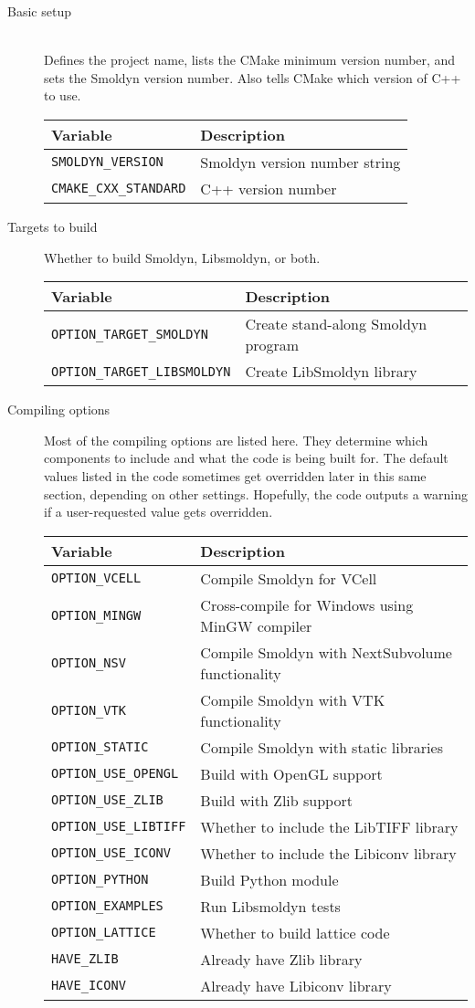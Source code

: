 \documentclass {book}
\newcommand {\ttt} {\texttt}
\begin{document}
\begin{description}

\item[Basic setup]
\hfill \\
Defines the project name, lists the CMake minimum version number, and sets the Smoldyn version number. Also tells CMake which version of C++ to use.\\
\begin{longtable}[c]{ll}
Variable & Description\\
\hline
\ttt{SMOLDYN\_VERSION} & Smoldyn version number string\\
\ttt{CMAKE\_CXX\_STANDARD} & C++ version number\\
\end{longtable}

\item[Targets to build]
Whether to build Smoldyn, Libsmoldyn, or both.
\begin{longtable}[c]{ll}
Variable & Description\\
\hline
\ttt{OPTION\_TARGET\_SMOLDYN} & Create stand-along Smoldyn program\\
\ttt{OPTION\_TARGET\_LIBSMOLDYN} & Create LibSmoldyn library\\
\end{longtable}

\item[Compiling options]
Most of the compiling options are listed here. They determine which components to include and what the code is being built for. The default values listed in the code sometimes get overridden later in this same section, depending on other settings. Hopefully, the code outputs a warning if a user-requested value gets overridden.
\begin{longtable}[c]{ll}
Variable & Description\\
\hline
\ttt{OPTION\_VCELL} & Compile Smoldyn for VCell\\
\ttt{OPTION\_MINGW} & Cross-compile for Windows using MinGW compiler\\
\ttt{OPTION\_NSV} & Compile Smoldyn with NextSubvolume functionality\\
\ttt{OPTION\_VTK} & Compile Smoldyn with VTK functionality\\
\ttt{OPTION\_STATIC} & Compile Smoldyn with static libraries\\
\ttt{OPTION\_USE\_OPENGL} & Build with OpenGL support\\
\ttt{OPTION\_USE\_ZLIB} & Build with Zlib support\\
\ttt{OPTION\_USE\_LIBTIFF} & Whether to include the LibTIFF library\\
\ttt{OPTION\_USE\_ICONV} & Whether to include the Libiconv library\\
\ttt{OPTION\_PYTHON}  & Build Python module\\
\ttt{OPTION\_EXAMPLES} & Run Libsmoldyn tests\\
\ttt{OPTION\_LATTICE} & Whether to build lattice code\\
\ttt{HAVE\_ZLIB} & Already have Zlib library\\
\ttt{HAVE\_ICONV} & Already have Libiconv library\\
\end{longtable}


\end{description}
\end{document}

